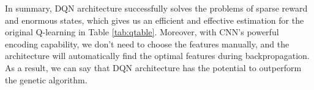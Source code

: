 \documentclass[letterpaper]{article} %
\begin{document}
In summary, DQN architecture successfully solves the problems of sparse reward and enormous states, which gives us an efficient and effective estimation for the original Q-learning in Table \ref{tab:qtable}. Moreover, with CNN's powerful encoding capability, we don't need to choose the features manually, and the architecture will automatically find the optimal features during backpropagation. As a result, we can say that DQN architecture has the potential to outperform the genetic algorithm.






\end{document}
